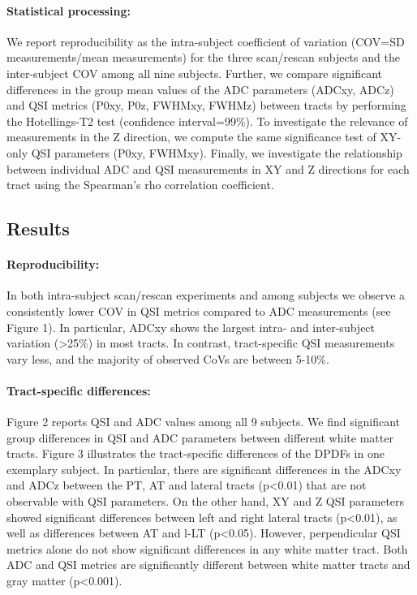 \paragraph{Statistical processing:} We report reproducibility as the intra-subject coefficient of variation (COV=SD measurements/mean measurements) for the three scan/rescan subjects and the inter-subject COV among all nine subjects. Further, we compare significant differences in the group mean values of the ADC parameters (ADCxy, ADCz) and QSI metrics (P0xy, P0z, FWHMxy, FWHMz) between tracts by performing the Hotellings-T2 test (confidence interval=99\%). To investigate the relevance of measurements in the Z direction, we compute the same significance test of XY-only QSI parameters (P0xy, FWHMxy). Finally, we investigate the relationship between individual ADC and QSI measurements in XY and Z directions for each tract using the Spearman’s rho correlation coefficient. 
\subsection*{Results} 
\paragraph{Reproducibility:} In both intra-subject scan/rescan experiments and among subjects we observe a consistently lower COV in QSI metrics compared to ADC measurements (see Figure 1). In particular, ADCxy shows the largest intra- and inter-subject variation (>25\%) in most tracts. In contrast, tract-specific QSI measurements vary less, and the majority of observed CoVs are between 5-10\%. 
\paragraph{Tract-specific differences:} Figure 2 reports QSI and ADC values among all 9 subjects. We find significant group differences in QSI and ADC parameters between different white matter tracts. Figure 3 illustrates the tract-specific differences of the DPDFs in one exemplary subject. In particular, there are significant differences in the ADCxy and ADCz between the PT, AT and lateral tracts (p<0.01) that are not observable with QSI parameters. On the other hand, XY and Z QSI parameters showed significant differences between left and right lateral tracts (p<0.01), as well as differences between AT and l-LT (p<0.05). However, perpendicular QSI metrics alone do not show significant differences in any white matter tract. Both ADC and QSI metrics are significantly different between white matter tracts and gray matter (p<0.001).

